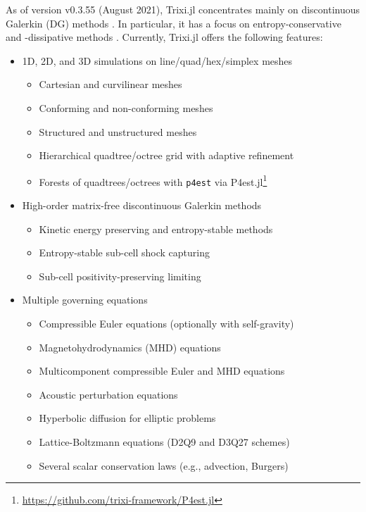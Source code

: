 \documentclass[hidelinks]{juliacon} %
\makeatletter
\newcommand{\eg}[0]{{e.g.\@}\xspace}
\newcommand{\trixi}{Trixi.jl\xspace}
\makeatother
\begin{document}
As of version v0.3.55 (August 2021), \trixi concentrates mainly on discontinuous
Galerkin (DG) methods \cite{hesthaven2007nodal, kopriva2009implementing}.
In particular, it has a focus on entropy-conservative and -dissipative methods
\cite{tadmor1987numerical, lefloch2002fully, fisher2013discretely,
ranocha2018comparison, chen2017entropy}. Currently, \trixi offers the
following features:
\begin{itemize}
  \item 1D, 2D, and 3D simulations on line/quad/hex/simplex meshes
  \begin{itemize}
    \item Cartesian and curvilinear meshes
    \item Conforming and non-conforming meshes
    \item Structured and unstructured meshes
    \item Hierarchical quadtree/octree grid with adaptive refinement
    \item Forests of quadtrees/octrees with \texttt{p4est} \cite{burstedde2011p4est}
          via P4est.jl\footnote{\url{https://github.com/trixi-framework/P4est.jl}}
  \end{itemize}

  \item High-order matrix-free discontinuous Galerkin methods
  \begin{itemize}
    \item Kinetic energy preserving and entropy-stable methods
    \item Entropy-stable sub-cell shock capturing
    \item Sub-cell positivity-preserving limiting
  \end{itemize}

  \item Multiple governing equations
  \begin{itemize}
    \item Compressible Euler equations (optionally with self-gravity)
    \item Magnetohydrodynamics (MHD) equations
    \item Multicomponent compressible Euler and MHD equations
    \item Acoustic perturbation equations
    \item Hyperbolic diffusion for elliptic problems
    \item Lattice-Boltzmann equations (D2Q9 and D3Q27 schemes)
    \item Several scalar conservation laws (\eg, advection, Burgers)
  \end{itemize}


\end{itemize}
\end{document}
